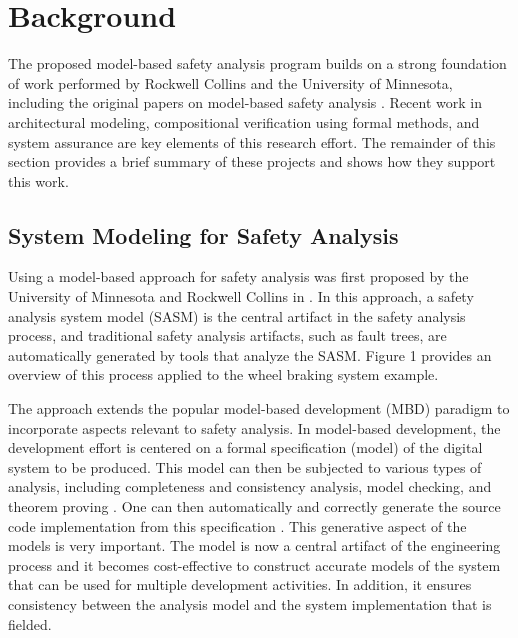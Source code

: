 \section{Background}

The proposed model-based safety analysis program builds on a strong foundation of work performed by Rockwell Collins and the University of Minnesota, including the original papers on model-based safety analysis \cite{Joshi05:Dasc, Joshi05:SafeComp, Joshi07:Hase}. Recent work in architectural modeling, compositional verification using formal methods, and system assurance are key elements of this research effort. The remainder of this section provides a brief summary of these projects and shows how they support this work. 

\subsection{System Modeling for Safety Analysis}

Using a model-based approach for safety analysis was first proposed by the University of Minnesota and Rockwell Collins in \cite{Joshi05:Dasc}. In this approach, a safety analysis system model (SASM) is the central artifact in the safety analysis process, and traditional safety analysis artifacts, such as fault trees, are automatically generated by tools that analyze the SASM. Figure 1 provides an overview of this process applied to the wheel braking system example.


The approach extends the popular model-based development (MBD) paradigm to incorporate aspects relevant to safety analysis. In model-based development, the development effort is centered on a formal specification (model) of the digital system to be produced. This model can then be subjected to various types of analysis, including completeness and consistency analysis, model checking, and theorem proving \cite{Halbwachs91:IEEE}. One can then automatically and correctly generate the source code implementation from this specification \cite{MathWorks, SCADE}. This generative aspect of the models is very important. The model is now a central artifact of the engineering process and it becomes cost-effective to construct accurate models of the system that can be used for multiple development activities. In addition, it ensures consistency between the analysis model and the system implementation that is fielded.

